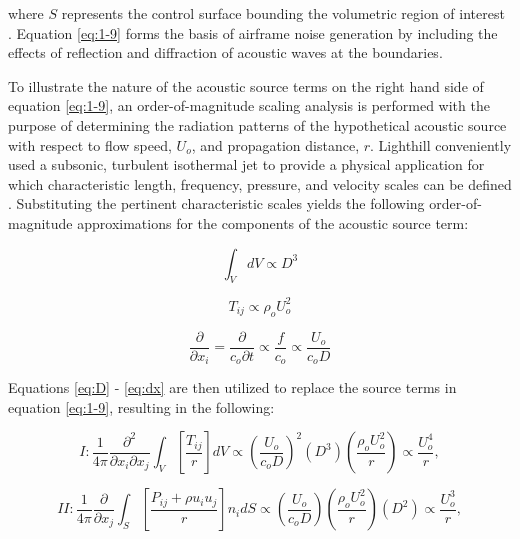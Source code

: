 where $S$ represents the control surface bounding the volumetric region of interest \cite{hirschberg2004}. Equation \ref{eq:1-9} forms the basis of airframe noise generation by including the effects of reflection and diffraction of acoustic waves at the boundaries.

To illustrate the nature of the acoustic source terms on the right hand side of equation \ref{eq:1-9}, an order-of-magnitude scaling analysis is performed with the purpose of determining the radiation patterns of the hypothetical acoustic source with respect to flow speed, $U_o$, and propagation distance, $r$. Lighthill conveniently used a subsonic, turbulent isothermal jet to provide a physical application for which characteristic length, frequency, pressure, and velocity scales can be defined \cite{lighthill1954}. Substituting the pertinent characteristic scales yields the following order-of-magnitude approximations for the components of the acoustic source term:

\begin{equation} \label{eq:D}
\int_{V} dV \propto D^3
\end{equation}

\begin{equation} \label{eq:U}
T_{ij} \propto \rho_o U_o^2
\end{equation}

\begin{equation} \label{eq:dx}
\frac{\partial}{\partial x_i} = \frac{\partial}{c_o \partial t} \propto \frac{f}{c_o} \propto \frac{U_o}{c_o D}
\end{equation}

Equations \ref{eq:D} - \ref{eq:dx} are then utilized to replace the source terms in equation \ref{eq:1-9}, resulting in the following:

\begin{equation}
I : \frac{1}{4\pi} \frac{\partial^2}{\partial x_i \partial x_j} \int_V \left[ \frac{T_{ij}}{r} \right] dV \propto \left( \frac{U_o}{c_o D} \right)^2 \left( D^3 \right) \left( \frac{\rho_o U_o^2}{r} \right) \propto \frac{U_o^4}{r},
\end{equation}

\begin{equation}
II : \frac{1}{4\pi} \frac{\partial}{\partial x_j} \int_S \left[ \frac{P_{ij} + \rho u_i u_j}{r} \right] n_i dS \propto \left( \frac{U_o}{c_oD} \right) \left( \frac{\rho_o U_o^2}{r} \right) \left( D^2 \right) \propto \frac{U_o^3}{r},
\end{equation}

